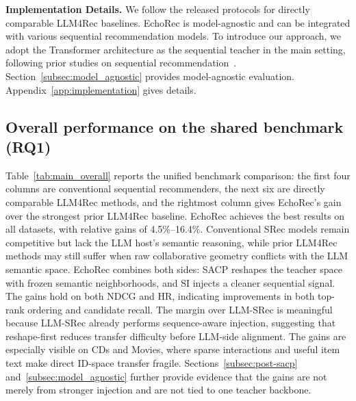 ﻿\documentclass{article}
\begin{document}
\noindent\textbf{Implementation Details.} We follow the released protocols for directly comparable LLM4Rec baselines. EchoRec is model-agnostic and can be integrated with various sequential recommendation models. To introduce our approach, we adopt the Transformer architecture as the sequential teacher in the main setting, following prior studies on sequential recommendation~\cite{qin2023mclrec,cui2025sracl}. Section~\ref{subsec:model_agnostic} provides model-agnostic evaluation. Appendix~\ref{app:implementation} gives details.

\subsection{Overall performance on the shared benchmark (RQ1)}
\label{subsec:rq1}

Table~\ref{tab:main_overall} reports the unified benchmark comparison: the first four columns are conventional sequential recommenders, the next six are directly comparable LLM4Rec methods, and the rightmost column gives EchoRec's gain over the strongest prior LLM4Rec baseline. EchoRec achieves the best results on all datasets, with relative gains of 4.5\%--16.4\%. Conventional SRec models remain competitive but lack the LLM host's semantic reasoning, while prior LLM4Rec methods may still suffer when raw collaborative geometry conflicts with the LLM semantic space. EchoRec combines both sides: SACP reshapes the teacher space with frozen semantic neighborhoods, and SI injects a cleaner sequential signal. The gains hold on both NDCG and HR, indicating improvements in both top-rank ordering and candidate recall. The margin over LLM-SRec is meaningful because LLM-SRec already performs sequence-aware injection, suggesting that reshape-first reduces transfer difficulty before LLM-side alignment. The gains are especially visible on CDs and Movies, where sparse interactions and useful item text make direct ID-space transfer fragile. Sections~\ref{subsec:post-sacp} and~\ref{subsec:model_agnostic} further provide evidence that the gains are not merely from stronger injection and are not tied to one teacher backbone.
\end{document}
